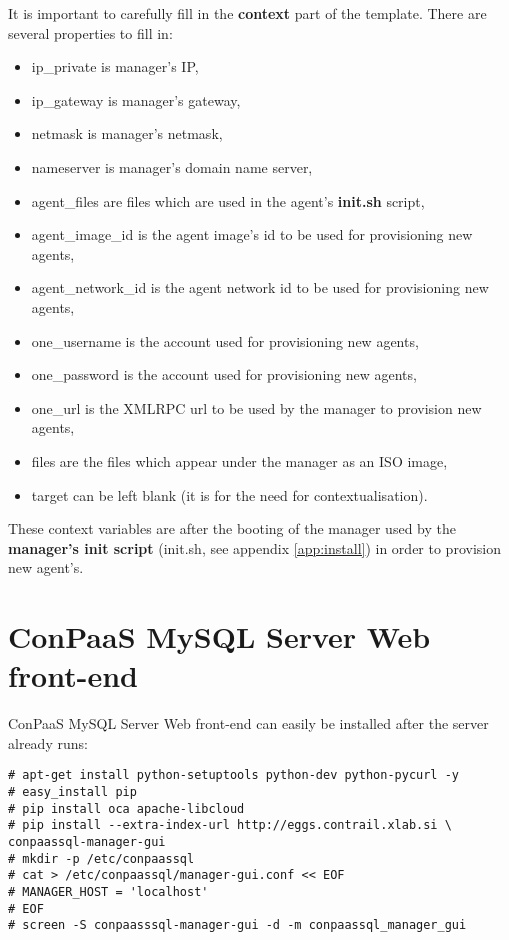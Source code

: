 \documentclass[a4paper,10pt]{article}
\begin{document}
It is important to carefully fill in the {\bf context} part of the template. There are several properties to fill in:
\begin{itemize}
	\item ip\_private is manager's IP,
	\item ip\_gateway is manager's gateway,
	\item netmask is manager's netmask,		
	\item nameserver is manager's domain name server,			
	\item agent\_files are files which are used in the agent's {\bf init.sh} script,
	\item agent\_image\_id is the agent image's id to be used for provisioning new agents,	
	\item agent\_network\_id is the agent network id to be used for provisioning new agents,		
	\item one\_username is the account used for provisioning new agents,
	\item one\_password is the account used for provisioning new agents,
	\item one\_url is the XMLRPC url to be used by the manager to provision new agents,	
	\item files are the files which appear under the manager as an ISO image,		
	\item target can be left blank (it is for the need for contextualisation).
\end{itemize}

These context variables are after the booting of the manager used by the {\bf manager's init script} (init.sh, see appendix \ref{app:install}) in order to provision new agent's.

\section{ConPaaS MySQL Server Web front-end}
\label{sec:web-front-end}
ConPaaS MySQL Server Web front-end can easily be installed after the server already runs: 

\begin{Verbatim}[frame=single]
# apt-get install python-setuptools python-dev python-pycurl -y
# easy_install pip
# pip install oca apache-libcloud
# pip install --extra-index-url http://eggs.contrail.xlab.si \
conpaassql-manager-gui
# mkdir -p /etc/conpaassql
# cat > /etc/conpaassql/manager-gui.conf << EOF
# MANAGER_HOST = 'localhost'
# EOF
# screen -S conpaasssql-manager-gui -d -m conpaassql_manager_gui
\end{Verbatim}
\end{document}

